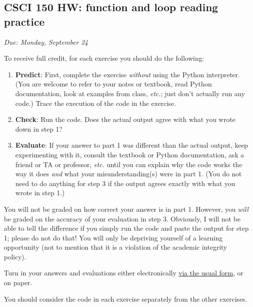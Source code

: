 \documentclass[]{article}
\date{}
\begin{document}
\subsection{CSCI 150 HW: function and loop reading
practice}\label{csci-150-hw-function-and-loop-reading-practice}

\emph{Due: Monday, September 24}

To receive full credit, for each exercise you should do the following:

\begin{enumerate}
\def\labelenumi{\arabic{enumi}.}
\item
  \textbf{Predict}: First, complete the exercise \emph{without} using
  the Python interpreter. (You are welcome to refer to your notes or
  textbook, read Python documentation, look at examples from class,
  \emph{etc.}; just don't actually run any code.) Trace the execution of
  the code in the exercise.
\item
  \textbf{Check}: Run the code. Does the actual output agree with what
  you wrote down in step 1?
\item
  \textbf{Evaluate}: If your answer to part 1 was different than the
  actual output, keep experimenting with it, consult the textbook or
  Python documentation, ask a friend or TA or professor, \emph{etc.}
  until you can explain why the code works the way it does \emph{and}
  what your misunderstanding(s) were in part 1. (You do not need to do
  anything for step 3 if the output agrees exactly with what you wrote
  in step 1.)
\end{enumerate}

You will not be graded on how correct your answer is in part 1. However,
you \emph{will} be graded on the accuracy of your evaluation in step 3.
Obviously, I will not be able to tell the difference if you simply run
the code and paste the output for step 1; please do not do that! You
will only be depriving yourself of a learning opportunity (not to
mention that it is a violation of the academic integrity policy).

Turn in your answers and evaluations either electronically
\href{https://goo.gl/forms/XsJVafSZLdedQY1M2}{via the usual form}, or on
paper.

You should consider the code in each exercise separately from the other
exercises.
\end{document}
